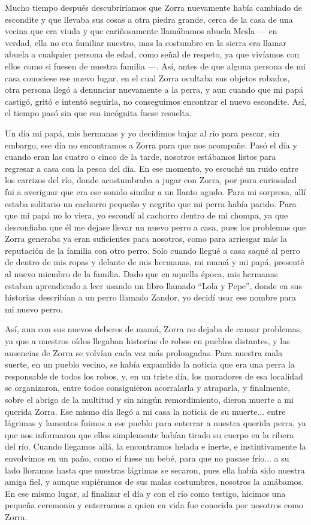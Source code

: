 Mucho tiempo después descubriríamos que Zorra nuevamente había cambiado de escondite y que llevaba sus cosas a otra piedra grande, cerca de la casa de una vecina que era viuda y que cariñosamente llamábamos abuela Mesla --- en verdad, ella no era familiar nuestro, mas la costumbre en la sierra era llamar abuela a cualquier persona de edad, como señal de respeto, ya que vivíamos con ellos como si fuesen de nuestra familia ---.
Así, antes de que alguna persona de mi casa conociese ese nuevo lugar, en el cual Zorra ocultaba sus objetos robados, otra persona llegó a denunciar nuevamente a la perra, y aun cuando que mi papá castigó, gritó e intentó seguirla, no conseguimos encontrar el nuevo escondite. Así, el tiempo pasó sin que esa incógnita fuese resuelta.

Un día mi papá, mis hermanas y yo decidimos bajar al río para pescar, sin embargo, ese día no encontramos a Zorra para que nos acompañe. Pasó el día y cuando eran las cuatro o cinco de la tarde, nosotros estábamos listos para regresar a casa con la pesca del día. En ese momento, yo escuché un ruido entre los carrizos del río, donde acostumbraba a jugar con Zorra, por pura curiosidad fui a averiguar que era ese sonido similar a un llanto agudo. Para mi sorpresa, allí estaba solitario un cachorro pequeño y negrito que mi perra había parido.
Para que mi papá no lo viera, yo escondí al cachorro dentro de mi chompa, ya que desconfiaba que él me dejase llevar un nuevo perro a casa, pues los problemas que Zorra generaba ya eran suficientes para nosotros, como para arriesgar más la reputación de la familia con otro perro.
Solo cuando llegué a casa saqué al perro de dentro de mis ropas y delante de mis hermanas, mi mamá y mi papá, presenté al nuevo miembro de la familia. Dado que en aquella época, mis hermanas estaban aprendiendo a leer usando un libro llamado ``Lola y Pepe'', donde en sus historias describían a un perro llamado Zandor, yo decidí usar ese nombre para mi nuevo perro.

Así, aun con sus nuevos deberes de mamá, Zorra no dejaba de causar problemas, ya que a nuestros oídos llegaban historias de robos en pueblos distantes, y las ausencias de Zorra se volvían cada vez más prolongadas.
Para nuestra mala suerte, en un pueblo vecino, se había expandido la noticia que era una perra la responsable de todos los robos, y, en un triste día, los moradores de esa localidad se organizaron, entre todos consiguieron acorralarla y atraparla, y finalmente, sobre el abrigo de la multitud y sin ningún remordimiento, dieron muerte a mi querida Zorra. 
Ese mismo día llegó a mi casa la noticia de su muerte... entre lágrimas y lamentos fuimos a ese pueblo para enterrar a nuestra querida perra, ya que nos informaron que ellos simplemente habían tirado su cuerpo en la ribera del río. Cuando llegamos allá, la encontramos helada e inerte, e instintivamente la envolvimos en un paño, como si fuese un bebé, para que no pasase frío... a su lado lloramos hasta que nuestras lágrimas se secaron, pues ella había sido nuestra amiga fiel, y aunque supiéramos de sus malas costumbres, nosotros la amábamos.
En ese mismo lugar, al finalizar el día y con el río como testigo, hicimos una pequeña ceremonia y enterramos a quien en vida fue conocida por nosotros como Zorra.

